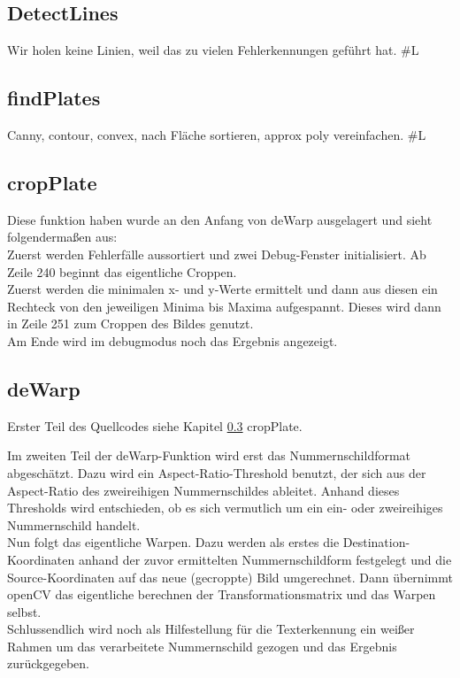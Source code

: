 \documentclass{../Vorlage/sebDenCls}
\begin{document}
\subsection{DetectLines}
Wir holen keine Linien, weil das zu vielen Fehlerkennungen geführt hat.
\#L
\subsection{findPlates}
\label{findpl}
Canny, contour, convex, nach Fläche sortieren, approx poly vereinfachen.
\#L
\subsection{cropPlate}
\label{croppl}
Diese funktion haben wurde an den Anfang von deWarp ausgelagert und sieht folgendermaßen aus:\\

Zuerst werden Fehlerfälle aussortiert und zwei Debug-Fenster initialisiert. Ab Zeile 240 beginnt das eigentliche Croppen. \\
Zuerst werden die minimalen x- und y-Werte ermittelt und dann aus diesen ein Rechteck von den jeweiligen Minima bis Maxima aufgespannt. Dieses wird dann in Zeile 251 zum Croppen des Bildes genutzt.\\
Am Ende wird im debugmodus noch das Ergebnis angezeigt.
\subsection{deWarp}
\label{dewarp}
Erster Teil des Quellcodes siehe Kapitel \ref{croppl} cropPlate.

Im zweiten Teil der deWarp-Funktion wird erst das Nummernschildformat abgeschätzt. Dazu wird ein Aspect-Ratio-Threshold benutzt, der sich aus der Aspect-Ratio des zweireihigen Nummernschildes ableitet. Anhand dieses Thresholds wird entschieden, ob es sich vermutlich um ein ein- oder zweireihiges Nummernschild handelt.\\
Nun folgt das eigentliche Warpen. Dazu werden als erstes die Destination-Koordinaten anhand der zuvor ermittelten Nummernschildform festgelegt und die Source-Koordinaten auf das neue (gecroppte) Bild umgerechnet. Dann übernimmt openCV das eigentliche berechnen der Transformationsmatrix und das Warpen selbst.\\
Schlussendlich wird noch als Hilfestellung für die Texterkennung ein weißer Rahmen um das verarbeitete Nummernschild gezogen und das Ergebnis zurückgegeben.
\end{document}
